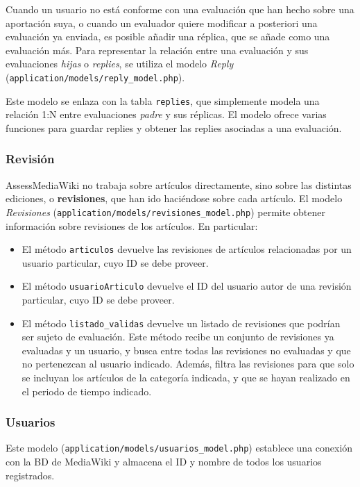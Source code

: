 \documentclass[11pt]{article}
\begin{document}
Cuando un usuario no está conforme con una evaluación que han hecho sobre una
aportación suya, o cuando un evaluador quiere modificar a posteriori una
evaluación ya enviada, es posible añadir una réplica, que se añade como una
evaluación más. Para representar la relación entre una evaluación y sus
evaluaciones \textit{hijas} o \textit{replies}, se utiliza el modelo
\textit{Reply} (\texttt{application/models/reply\_model.php}).

Este modelo se enlaza con la tabla \texttt{replies}, que simplemente modela una
relación 1:N entre evaluaciones \textit{padre} y sus réplicas. El modelo ofrece
varias funciones para guardar replies y obtener las replies asociadas a una
evaluación.

\subsubsection{Revisión}

AssessMediaWiki no trabaja sobre artículos directamente, sino sobre las
distintas ediciones, o \textbf{revisiones}, que han ido haciéndose sobre cada
artículo. El modelo \textit{Revisiones}
(\texttt{application/models/revisiones\_model.php}) permite obtener información
sobre revisiones de los artículos. En particular:
\begin{itemize}
\item El método \texttt{articulos} devuelve las revisiones de artículos
  relacionadas por un usuario particular, cuyo ID se debe proveer.
\item El método \texttt{usuarioArticulo} devuelve el ID del usuario autor de una
  revisión particular, cuyo ID se debe proveer.
\item El método \texttt{listado\_validas} devuelve un listado de revisiones que
  podrían ser sujeto de evaluación. Este método recibe un conjunto de revisiones
  ya evaluadas y un usuario, y busca entre todas las revisiones no evaluadas y
  que no pertenezcan al usuario indicado. Además, filtra las revisiones para que
  solo se incluyan los artículos de la categoría indicada, y que se hayan
  realizado en el periodo de tiempo indicado.
\end{itemize}

\subsubsection{Usuarios}

Este modelo (\texttt{application/models/usuarios\_model.php}) establece una
conexión con la BD de MediaWiki y almacena el ID y nombre de todos los usuarios
registrados.
\end{document}

